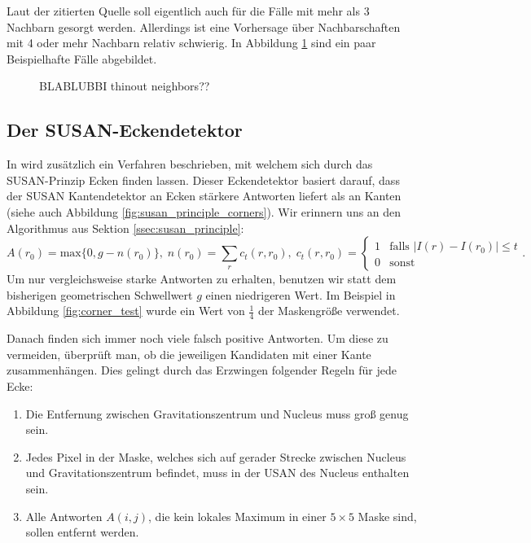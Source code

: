 \documentclass[a4paper, 11pt]{report}
\theoremstyle{definition}
\begin{document}
			Laut der zitierten Quelle \cite{thinout} soll eigentlich auch für die Fälle mit mehr als 3 Nachbarn gesorgt werden. Allerdings ist eine Vorhersage über Nachbarschaften mit 4 oder mehr Nachbarn relativ schwierig. In Abbildung \ref{fig:thinout-neighbors} sind ein paar Beispielhafte Fälle abgebildet.

			\begin{figure}
				\caption{BLABLUBBI thinout neighbors??}
				\label{fig:thinout-neighbors}
			\end{figure}

		
		\subsection{Der SUSAN-Eckendetektor}\label{ssec:corner_detector}
			In \cite{SUSAN} wird zusätzlich ein Verfahren beschrieben, mit welchem sich durch das SUSAN-Prinzip Ecken finden lassen. Dieser Eckendetektor basiert darauf, dass der SUSAN Kantendetektor an Ecken stärkere Antworten liefert als an Kanten (siehe auch Abbildung \ref{fig:susan_principle_corners}).
			Wir erinnern uns an den Algorithmus aus Sektion \ref{ssec:susan_principle}:
			$$
				A(r_0) = \text{max}\{0, g - n(r_0)\},\;
				n(r_0) = \sum_r c_t(r, r_0),\;
				c_t(r, r_0) =
					\begin{cases}
						1 	& \text{falls } |I(r) - I(r_0)| \leq t 	\\
						0 	& \text{sonst}
					\end{cases}.
			$$
			Um nur vergleichsweise starke Antworten zu erhalten, benutzen wir statt dem bisherigen geometrischen Schwellwert $g$ einen niedrigeren Wert. Im Beispiel in Abbildung \ref{fig:corner_test} wurde ein Wert von $\frac{1}{4}$ der Maskengröße verwendet.

			Danach finden sich immer noch viele falsch positive Antworten. Um diese zu vermeiden, überprüft man, ob die jeweiligen Kandidaten mit einer Kante zusammenhängen. Dies gelingt durch das Erzwingen folgender Regeln für jede Ecke:

			\begin{enumerate}
				\item Die Entfernung zwischen Gravitationszentrum und Nucleus muss groß genug sein.
				\item Jedes Pixel in der Maske, welches sich auf gerader Strecke zwischen Nucleus und Gravitationszentrum befindet, muss in der USAN des Nucleus enthalten sein.
				\item Alle Antworten $A(i,j)$, die kein lokales Maximum in einer $5\times 5$ Maske sind, sollen entfernt werden.
			\end{enumerate}
\end{document}
